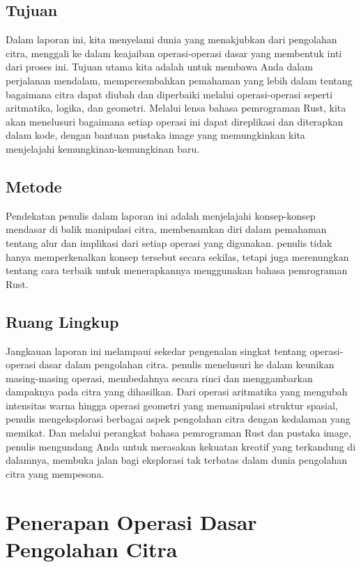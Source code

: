 \documentclass[a4paper,12pt,openany]{book}
\begin{document}
\section{Tujuan}

Dalam laporan ini, kita menyelami dunia yang menakjubkan dari pengolahan citra, menggali ke dalam keajaiban operasi-operasi dasar yang membentuk inti dari proses ini. Tujuan utama kita adalah untuk membawa Anda dalam perjalanan mendalam, mempersembahkan pemahaman yang lebih dalam tentang bagaimana citra dapat diubah dan diperbaiki melalui operasi-operasi seperti aritmatika, logika, dan geometri. Melalui lensa bahasa pemrograman Rust, kita akan menelusuri bagaimana setiap operasi ini dapat direplikasi dan diterapkan dalam kode, dengan bantuan pustaka image yang memungkinkan kita menjelajahi kemungkinan-kemungkinan baru.

\section{Metode}

Pendekatan penulis dalam laporan ini adalah menjelajahi konsep-konsep mendasar di balik manipulasi citra, membenamkan diri dalam pemahaman tentang alur dan implikasi dari setiap operasi yang digunakan. penulis tidak hanya memperkenalkan konsep tersebut secara sekilas, tetapi juga merenungkan tentang cara terbaik untuk menerapkannya menggunakan bahasa pemrograman Rust.

\section{Ruang Lingkup}

Jangkauan laporan ini melampaui sekedar pengenalan singkat tentang operasi-operasi dasar dalam pengolahan citra. penulis menelusuri ke dalam keunikan masing-masing operasi, membedahnya secara rinci dan menggambarkan dampaknya pada citra yang dihasilkan. Dari operasi aritmatika yang mengubah intensitas warna hingga operasi geometri yang memanipulasi struktur spasial, penulis mengeksplorasi berbagai aspek pengolahan citra dengan kedalaman yang memikat. Dan melalui perangkat bahasa pemrograman Rust dan pustaka image, penulis mengundang Anda untuk merasakan kekuatan kreatif yang terkandung di dalamnya, membuka jalan bagi eksplorasi tak terbatas dalam dunia pengolahan citra yang mempesona.

\chapter{Penerapan Operasi Dasar Pengolahan Citra}
\end{document}
